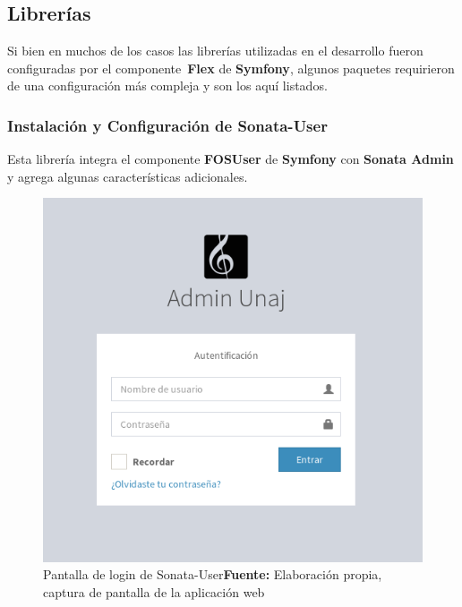 
\subsection{Librerías}%
\label{sub:librerias}

Si bien en muchos de los casos las librerías utilizadas en el desarrollo fueron configuradas por el componente~\textbf{Flex}  de \textbf{Symfony}, algunos paquetes
requirieron de una configuración más compleja y son los aquí listados.

\subsubsection{Instalación y Configuración de Sonata-User}%
\label{ssub:instalacion_y_configuración_de_sonata-user}

Esta librería integra el componente \textbf{FOSUser} de \textbf{Symfony} con \textbf{Sonata Admin} y agrega algunas características adicionales.

\begin{figure}[h]
    \includegraphics[width=1\linewidth]{image/adminLogin.png}
    \caption{Pantalla de login de Sonata-User\newline \textbf{Fuente:} Elaboración propia, captura de pantalla de la aplicación web}
    \label{fig:image/adminLogin}
\end{figure}




